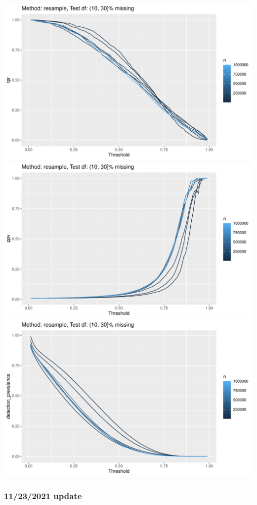 \documentclass[12pt]{article}
\begin{document}
\pagebreak
\begin{center}
\includegraphics[width=.7\textwidth]{size_resample_1030missing_tpr.pdf}
\includegraphics[width=.7\textwidth]{size_resample_1030missing_ppv.pdf}
\includegraphics[width=.7\textwidth]{size_resample_1030missing_detection_prevalance.pdf}
\end{center}



\pagebreak
\subsubsection*{11/23/2021 update}
\end{document}
